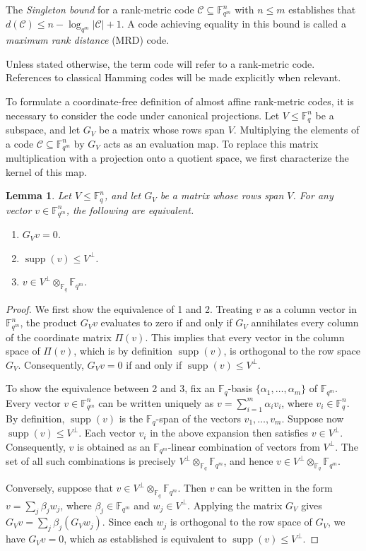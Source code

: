 \documentclass[a4paper,11pt,reqno]{article}
\newcommand{\F}{\mathbb{F}}
\newcommand{\supp}{\operatorname{supp}}
\newcommand{\C}{\mathcal{C}}
\theoremstyle{plain} \numberwithin{equation}{section}
\newtheorem{lemma}[theorem]{Lemma}
\theoremstyle{definition}
\begin{document}
The \emph{Singleton bound} for a rank-metric code $\mathcal{C} \subseteq \mathbb{F}_{q^m}^n$ with $n \leq m$ establishes that $d(\mathcal{C}) \leq n - \log_{q^m}|\mathcal{C}| + 1$. A code achieving equality in this bound is called a \emph{maximum rank distance} (MRD) code.

Unless stated otherwise, the term code will refer to a rank-metric code. References to classical Hamming codes will be made explicitly when relevant.

To formulate a coordinate-free definition of almost affine rank-metric codes, it is necessary to consider the code under canonical projections. Let $V\leq \F_q^n$ be a subspace, and let $G_V$ be a matrix whose rows span $V$. Multiplying the elements of a code $\C\subseteq \F_{q^m}^n$ by $G_V$ acts as an evaluation map. To replace this matrix multiplication with a projection onto a quotient space, we first characterize the kernel of this map.

\begin{lemma} \label{lem:projectkernel}
    Let $V\leq \F_q^n$, and let $G_V$ be a matrix whose rows span $V$. For any vector $v\in \F_{q^m}^n$, the following are equivalent.
    \begin{enumerate}
        \item $G_V v=0$.
        \item $\supp(v) \leq V^\perp$.
        \item $v\in V^\perp \otimes_{\F_q} \F_{q^m}$.
    \end{enumerate}
\end{lemma}
\begin{proof}
We first show the equivalence of 1 and 2. Treating $v$ as a column vector in $\F_{q^m}^n$, the product $G_V v$ evaluates to zero if and only if $G_V$ annihilates every column of the coordinate matrix $\Pi(v)$. This implies that every vector in the column space of $\Pi(v)$, which is by definition $\supp(v)$, is orthogonal to the row space $G_V$. Consequently, $G_Vv=0$ if and only if $\supp(v) \leq V^\perp$.

To show the equivalence between 2 and 3, fix an $\F_q$-basis $\{\alpha_1,\ldots,\alpha_m\}$ of $\F_{q^m}$. Every vector $v\in \F_{q^m}^n$ can be written uniquely as $v= \sum^m_{i=1} \alpha_i v_i$, where $v_i \in \F_q^n$. By definition, $\supp(v)$ is the $\F_q$-span of the vectors $v_1,\ldots,v_m$. Suppose now $\supp(v) \leq V^\perp$. Each vector $v_i$ in the above expansion then satisfies $v\in V^\perp$. Consequently, $v$ is obtained as an $\F_{q^m}$-linear combination of vectors from $V^\perp$. The set of all such combinations is precisely $V^\perp \otimes_{\F_q} \F_{q^m}$, and hence $v\in V^\perp \otimes_{\F_q} \F_{q^m}$.

Conversely, suppose that $v\in V^\perp \otimes_{\F_q} \F_{q^m}$. Then $v$ can be written in the form $v=\sum_j \beta_j w_j$, where $\beta_j\in \F_{q^m}$ and $w_j\in V^\perp$. Applying the matrix $G_V$ gives $G_Vv = \sum_j \beta_j(G_Vw_j)$. Since each $w_j$ is orthogonal to the row space of $G_V$, we have $G_Vv=0$, which as established is equivalent to $\supp(v)\leq V^\perp$.
\end{proof}
\end{document}
